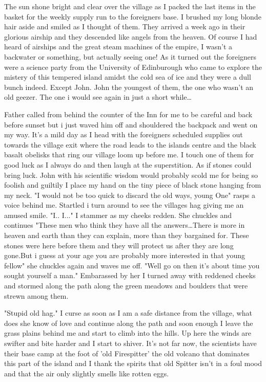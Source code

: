 The sun shone bright and clear over the village as I packed the last items in the basket for the weekly supply run to the foreigners base. I brushed my long blonde hair aside and smiled as I thought of them. They arrived a week ago in their glorious airship and they descended like angels from the heaven. Of course I had heard of airships and the great steam machines of the empire, I wasn't a backwater or something, but actually seeing one! As it turned out the foreigners were a science party from the University of Edinburough who came to explore the mistery of this tempered island amidst the cold sea of ice and they were a dull bunch indeed. Except John. John the youngest of them, the one who wasn't an old geezer. The one i would see again in just a short while\dots

Father called from behind the counter of the Inn for me to be careful and back before sunset but i just waved him off and shouldered the backpack and went on my way. It's a mild day as I head with the foreigners scheduled supplies out towards the village exit where the road leads to the islands centre and the black basalt obelisks that ring our village loom up before me. I touch one of them for good luck as I always do and then laugh at the superstition. As if stones could bring luck. John with his scientific wisdom would probably scold me for being so foolish and guiltily I place my hand on the tiny piece of black stone hanging from my neck. "I would not be too quick to discard the old ways, young One" rasps a voice behind me. Startled i turn around to see the villages hag giving me an amused smile. "I.. I..." I stammer as my cheeks redden. She chuckles and continues "These men who think they have all the answers\dots There is more in heaven and earth than they can explain, more than they bargained for. These stones were here before them and they will protect us after they are long gone.But i guess at your age you are probably more interested in that young fellow" she chuckles again and waves me off. "Well go on then it's about time you sought yourself a man." Embarassed by her I turned away with reddened cheeks and stormed along the path along the green meadows and boulders that were strewn among them.

"Stupid old hag." I curse as soon as I am a safe distance from the village, what does she know of love and continue along the path and soon enough I leave the grass plains behind me and start to climb into the hills. Up here the winds are swifter and bite harder and I start to shiver. It's not far now, the scientists have their base camp at the foot of 'old Firespitter' the old volcano that dominates this part of the island and I thank the spirits that old Spitter isn't in a foul mood and that the air only slightly smells like rotten eggs.

